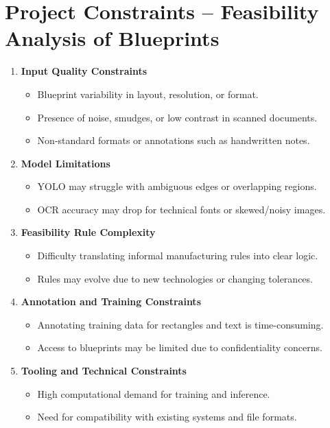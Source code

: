\documentclass{article}
\begin{document}
\section*{Project Constraints – Feasibility Analysis of Blueprints}

\begin{enumerate}
    \item \textbf{Input Quality Constraints}
    \begin{itemize}
        \item Blueprint variability in layout, resolution, or format.
        \item Presence of noise, smudges, or low contrast in scanned documents.
        \item Non-standard formats or annotations such as handwritten notes.
    \end{itemize}

    \item \textbf{Model Limitations}
    \begin{itemize}
        \item YOLO may struggle with ambiguous edges or overlapping regions.
        \item OCR accuracy may drop for technical fonts or skewed/noisy images.
    \end{itemize}

    \item \textbf{Feasibility Rule Complexity}
    \begin{itemize}
        \item Difficulty translating informal manufacturing rules into clear logic.
        \item Rules may evolve due to new technologies or changing tolerances.
    \end{itemize}

    \item \textbf{Annotation and Training Constraints}
    \begin{itemize}
        \item Annotating training data for rectangles and text is time-consuming.
        \item Access to blueprints may be limited due to confidentiality concerns.
    \end{itemize}

    \item \textbf{Tooling and Technical Constraints}
    \begin{itemize}
        \item High computational demand for training and inference.
        \item Need for compatibility with existing systems and file formats.
    \end{itemize}


\end{enumerate}
\end{document}
